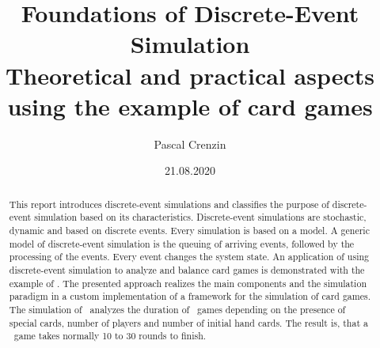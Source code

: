 \documentclass[10]{article}
\title{Foundations of Discrete-Event Simulation \\ \footnotesize{Theoretical and practical aspects using the example of card games}}
\author{Pascal Crenzin}
\date{21.08.2020}
\begin{document}
	\maketitle
	\begin{abstract}
	This report introduces discrete-event simulations and classifies the purpose of discrete-event simulation based on its characteristics. Discrete-event simulations are stochastic, dynamic and based on discrete events. Every simulation is based on a model. A generic model of discrete-event simulation is the queuing of arriving events, followed by the processing of the events. Every event changes the system state. An application of using discrete-event simulation to analyze and balance card games is demonstrated with the example of \uno. The presented approach realizes the main components and the simulation paradigm in a custom implementation of a framework for the simulation of card games. The simulation of \uno\ analyzes the duration of \uno\ games depending on the presence of special cards, number of players and number of initial hand cards. The result is, that a \uno\ game takes normally 10 to 30 rounds to finish.
	\end{abstract}
	\newpage
	\tableofcontents
	\newpage
  
  
  	
	
	
	

\newpage
% 


\end{document}
